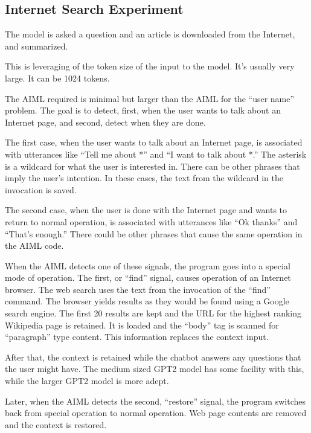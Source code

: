 \subsection{Internet Search Experiment}
The model is asked a question and an article is downloaded from the Internet, and summarized. %

This is leveraging of the token size of the input to the model. It's usually very large. It can be 1024 tokens.

The AIML required is minimal but larger than the AIML for the ``user name'' problem. The goal is to detect, first, when the user wants to talk about an Internet page, and second, detect when they are done.

The first case, when the user wants to talk about an Internet page, is associated with utterances like ``Tell me about *'' and ``I want to talk about *.'' The asterisk is a wildcard for what the user is interested in. There can be other phrases that imply the user's intention. In these cases, the text from the wildcard in the invocation is saved.

The second case, when the user is done with the Internet page and wants to return to normal operation, is associated with utterances like ``Ok thanks'' and ``That's enough.'' 
There could be other phrases that cause the same operation in the AIML code.

When the AIML detects one of these signals, the program goes into a special mode of operation. The first, or ``find'' signal, causes operation of an Internet browser. The web search uses the text from the invocation of the ``find'' command. The browser yields results as they would be found using a Google search engine. The first 20 results are kept and the URL for the highest ranking Wikipedia page is retained. It is loaded and the ``body'' tag is scanned for ``paragraph'' type content. This information replaces the context input. 

After that, the context is retained while the chatbot answers any questions that the user might have. The medium sized GPT2 model has some facility with this, while the larger GPT2 model is more adept.

Later, when the AIML detects the second, ``restore'' signal, the program switches back from special operation to normal operation. Web page contents are removed and the context is restored. %

